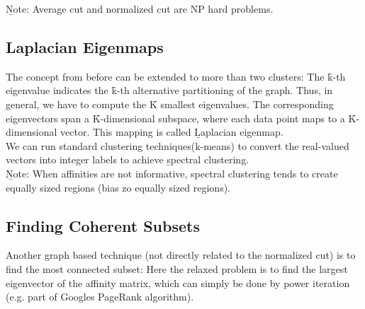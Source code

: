 \b{Note:} Average cut and normalized cut are NP hard problems.

\subsection{Laplacian Eigenmaps}
The concept from before can be extended to more than two clusters: The \f{k-th} eigenvalue indicates the \f{k-th} alternative partitioning of the graph. Thus, in general, we have to compute the \f{K} smallest eigenvalues. The corresponding eigenvectors span a \f{K}-dimensional subspace, where each data point maps to a \f{K}-dimensional vector. This mapping is called \b{Laplacian eigenmap}.\\
We can run standard clustering techniques(k-means) to convert the real-valued vectors into integer labels to achieve \b{spectral clustering}.\\

\b{Note:} When affinities are not informative, spectral clustering tends to create equally sized regions (bias zo equally sized regions).

\subsection{Finding Coherent Subsets}
Another graph based technique (not directly related to the normalized cut) is to find the most connected subset:
Here the relaxed problem is to find the largest eigenvector of the affinity matrix, which can simply be done by power iteration (e.g. part of Googles PageRank algorithm).

\newpage